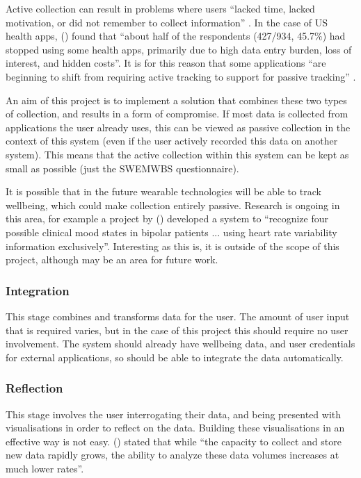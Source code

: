 \documentclass[11pt,openright,a4paper]{report}
\begin{document}
Active collection can result in problems where users \enquote{lacked time, lacked motivation, or did not remember to collect information} \parencite{li2010stage}. In the case of US health apps, \citeauthor{krebs2015health} (\citeyear{krebs2015health}) found that \enquote{about half of the respondents (427/934, 45.7\%) had stopped using some health apps, primarily due to high data entry burden, loss of interest, and hidden costs}. It is for this reason that some applications \enquote{are beginning to shift from requiring active tracking to
support for passive tracking} \parencite{rooksby2014personal}.

An aim of this project is to implement a solution that combines these two types of collection, and results in a form of compromise. If most data is collected from applications the user already uses, this can be viewed as passive collection in the context of this system (even if the user actively recorded this data on another system). This means that the active collection within this system can be kept as small as possible (just the SWEMWBS questionnaire).

It is possible that in the future wearable technologies will be able to track wellbeing, which could make collection entirely passive. Research is ongoing in this area, for example a project by \citeauthor{valenza2014wearable} (\citeyear{valenza2014wearable}) developed a system to \enquote{recognize four possible clinical mood states in bipolar patients ... using heart rate variability information exclusively}. Interesting as this is, it is outside of the scope of this project, although may be an area for future work.

\subsubsection{Integration}
This stage combines and transforms data for the user. The amount of user input that is required varies, but in the case of this project this should require no user involvement. The system should already have wellbeing data, and user credentials for external applications, so should be able to integrate the data automatically.

\subsubsection{Reflection}
This stage involves the user interrogating their data, and being presented with visualisations in order to reflect on the data. Building these visualisations in an effective way is not easy. \citeauthor{keim2008visual} (\citeyear{keim2008visual}) stated that while \enquote{the capacity to collect and store new data rapidly grows, the ability to analyze these data volumes increases at much lower rates}.
\end{document}
